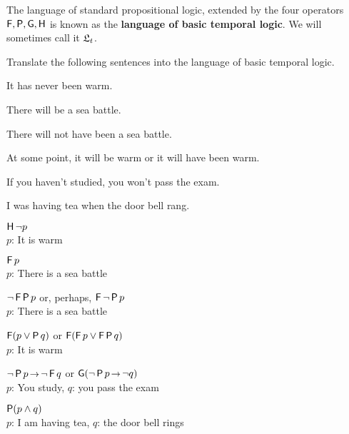 The language of standard propositional logic, extended by the four operators
$\operatorname{\mathsf{F}},\operatorname{\mathsf{P}},\operatorname{\mathsf{G}},\operatorname{\mathsf{H}}$ is known as the \textbf{language of basic temporal logic}. We
will sometimes call it $\mathfrak{L}_t$.


\begin{exercise}
  Translate the following sentences into the language of basic temporal logic.
  \begin{exlist}
  \item It has never been warm. %
  \item There will be a sea battle. %
  \item There will not have been a sea battle. %
  \item At some point, it will be warm or it will have been warm. %
  \item If you haven't studied, you won't pass the exam. %
  \item I was having tea when the door bell rang. %
  \end{exlist}
\end{exercise}
\begin{solution}
  \begin{sollist}
  \item $\operatorname{\mathsf{H}} \neg p$\\
    $p$: It is warm\\[-2mm]
  \item $\operatorname{\mathsf{F}} p$\\
    $p$: There is a sea battle\\[-2mm]
  \item $\neg \operatorname{\mathsf{F}} \operatorname{\mathsf{P}} p$ or, perhaps, $\operatorname{\mathsf{F}}\neg \operatorname{\mathsf{P}} p$\\
    $p$: There is a sea battle\\[-2mm]
  \item  $\operatorname{\mathsf{F}}(p \lor \operatorname{\mathsf{P}} q)$ or $\operatorname{\mathsf{F}}(\operatorname{\mathsf{F}} p \lor \operatorname{\mathsf{F}}\operatorname{\mathsf{P}} q)$\\
    $p$: It is warm\\[-2mm]
  \item $\neg \tP p \to \neg \tF q$ or $\tG(\neg\tP p \to \neg q)$\\
    $p$: You study, $q$: you pass the exam\\[-2mm]
  \item $\operatorname{\mathsf{P}}(p \land q)$\\
    $p$: I am having tea, $q$: the door bell rings
  \end{sollist}
\end{solution}


